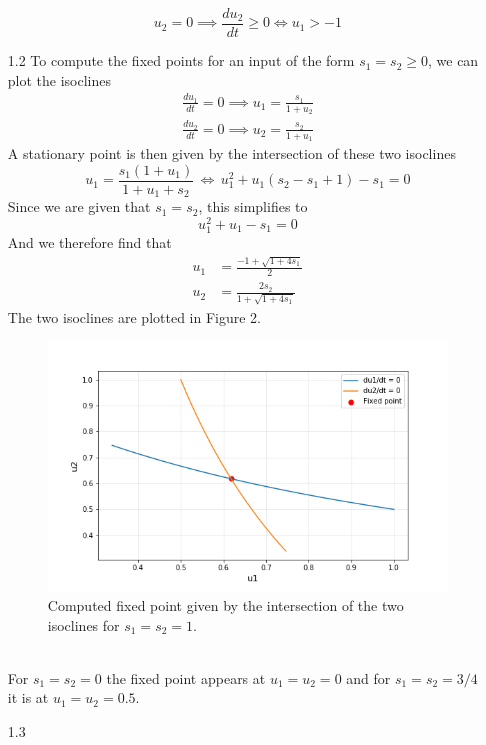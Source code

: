 \documentclass[12pt]{article}
\begin{document}
\begin{enumerate}
\[    u_{2}=0 \implies \frac{du_{2}}{dt} \geq 0 \Leftrightarrow u_{1} > -1
\]
\item[1.2] To compute the fixed points for an input of the form $s_{1} = s_{2} \geq 0$, we can plot the isoclines
\begin{align*}
    \frac{du_{1}}{dt} = 0 \implies u_{1}=\frac{s_{1}}{1+u_{2}}\\
    \frac{du_{2}}{dt} = 0 \implies u_{2}=\frac{s_{2}}{1+u_{1}}
\end{align*}
A stationary point is then given by the intersection of these two isoclines
\[
    u_{1} = \frac{s_{1}(1 + u_{1})}{1 + u_{1} + s_{2}} \, \Leftrightarrow  \, u_{1}^2 + u_{1}(s_{2} - s_{1} + 1) - s_{1} = 0
\]
Since we are given that $s_{1}=s_{2}$, this simplifies to
\[
    u_{1}^2 + u_{1} - s_{1} = 0
\]
And we therefore find that
\begin{align*}
    u_{1} &= \frac{-1 + \sqrt{1 + 4s_{1}}}{2}\\
    u_{2} &= \frac{2s_{2}}{1 + \sqrt{1 + 4s_{1}}}  
\end{align*}
The two isoclines are plotted in Figure 2.
\begin{figure}[h!]
    \centering
    \includegraphics[width=1\textwidth]{./fig2.png}
    \caption{Computed fixed point given by the intersection of the two isoclines for $s_{1}=s_{2}=1$.}
\end{figure}\\
For $s_{1}=s_{2}=0$ the fixed point appears at $u_{1}=u_{2}=0$ and for $s_{1}=s_{2}=3/4$ it is at $u_{1}=u_{2}=0.5$.
\item[1.3]



\end{enumerate}
\end{document}
